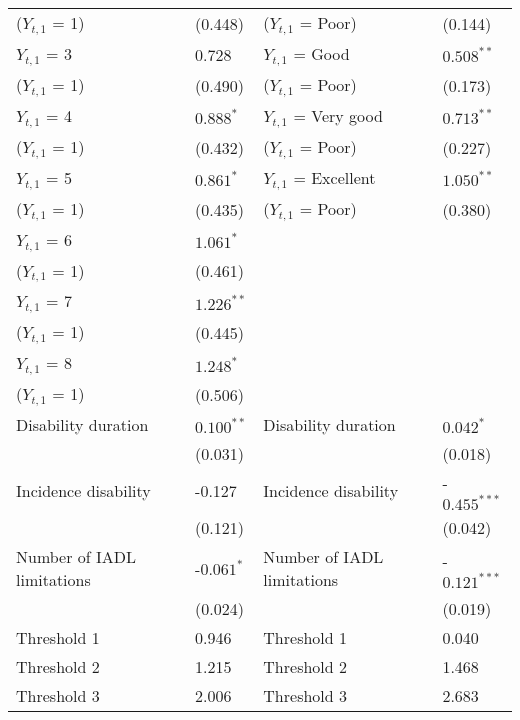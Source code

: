 \documentclass[12pt]{article}
\begin{document}
\begin{table}[htbp]
\begin{tabular}{ll ll}
($Y_{t,1}$ = 1)             &  (0.448)          & ($Y_{t,1}$ = Poor)          &  (0.144)\\
$Y_{t,1}$ = 3               &  0.728            & $Y_{t,1}$ = Good            &  $0.508^{**}$\\
($Y_{t,1}$ = 1)             &  (0.490)          & ($Y_{t,1}$ = Poor)          &  (0.173)\\
$Y_{t,1}$ = 4               & $0.888^{*}$       & $Y_{t,1}$ = Very good       &  $0.713^{**}$\\
($Y_{t,1}$ = 1)             &  (0.432)          & ($Y_{t,1}$ = Poor)          &  (0.227)\\
$Y_{t,1}$ = 5               &  $0.861^{*}$      & $Y_{t,1}$ = Excellent       &  $1.050^{**}$\\
($Y_{t,1}$ = 1)             &  (0.435)          & ($Y_{t,1}$ = Poor)          &  (0.380)\\
$Y_{t,1}$ = 6               &  $1.061^{*}$ &&\\
($Y_{t,1}$ = 1)             &  (0.461)     &&\\
$Y_{t,1}$ = 7               &  $1.226^{**}$&&\\
($Y_{t,1}$ = 1)             &  (0.445)      &&\\
$Y_{t,1}$ = 8               &  $1.248^{*}$  &&\\
($Y_{t,1}$ = 1)             &  (0.506)      &&\\
Disability duration         &  $0.100^{**}$     & Disability duration         &  $0.042^{*}$\\
                            &  (0.031)          &                             &  (0.018)\\
Incidence disability        & -0.127            & Incidence disability        & -$0.455^{***}$\\
                            &  (0.121)          &                             & (0.042)\\
Number of IADL limitations  & -$0.061^{*}$      & Number of IADL limitations  & -$0.121^{***}$\\
                            &  (0.024)          &                             & (0.019)\\
Threshold 1                 &  0.946            & Threshold 1                 & 0.040          \\
Threshold 2                 &  1.215            & Threshold 2                 & 1.468          \\
Threshold 3                 &  2.006            & Threshold 3                 & 2.683          \\

\end{tabular}
\end{table}
\end{document}
